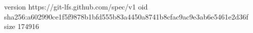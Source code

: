 version https://git-lfs.github.com/spec/v1
oid sha256:a602990ce1f5f9878b1bfd555b83a4450a8741b8cfac9ac9e3ab6e5461e2d36f
size 174916
